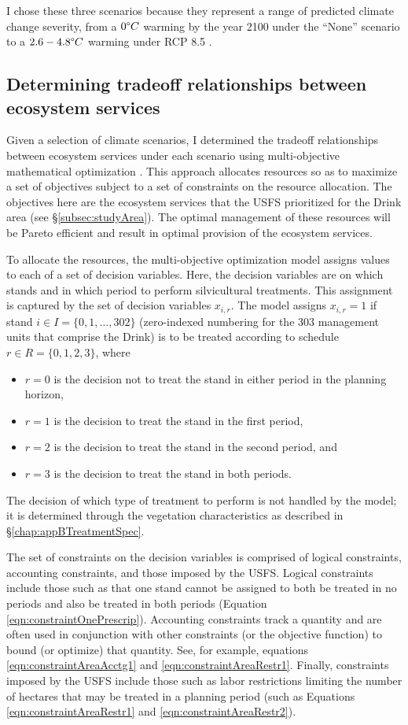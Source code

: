 I chose these three scenarios because they represent a range of predicted climate change severity, from a $0 \degree C$ warming by the year 2100 under the ``None'' scenario to a $2.6-4.8 \degree C$ warming under RCP 8.5 \cite{ipcc2013climate}.

\subsection{Determining tradeoff relationships between ecosystem services}
\label{subsec:whyUsingMultiObjModel}
Given a selection of climate scenarios, I determined the tradeoff relationships between ecosystem services under each scenario using multi-objective mathematical optimization \cite{TothFsci2009}. This approach allocates resources so as to maximize a set of objectives subject to a set of constraints on the resource allocation. The objectives here are the ecosystem services that the USFS prioritized for the Drink area (see \S \ref{subsec:studyArea}). The optimal management of these resources will be Pareto efficient and result in optimal provision of the ecosystem services.

To allocate the resources, the multi-objective optimization model assigns values to each of a set of decision variables. Here, the decision variables are on which stands and in which period to perform silvicultural treatments. This assignment is captured by the set of decision variables $x_{i,r}$. The model assigns $x_{i,r} = 1$ if stand $i \in I = \{0,1,\ldots,302\}$ (zero-indexed numbering for the 303 management units that comprise the Drink) is to be treated according to schedule $r \in R = \{0,1,2,3\}$, where
\begin{itemize}
\item $r = 0$ is the decision not to treat the stand in either period in the planning horizon,\item $r = 1$ is the decision to treat the stand in the first period,
\item $r = 2$ is the decision to treat the stand in the second period, and
\item $r = 3$ is the decision to treat the stand in both periods.
\end{itemize}
The decision of which type of treatment to perform is not handled by the model; it is determined through the vegetation characteristics as described in \S \ref{chap:appBTreatmentSpec}.

The set of constraints on the decision variables is comprised of logical constraints, accounting constraints, and those imposed by the USFS. Logical constraints include those such as that one stand cannot be assigned to both be treated in no periods and also be treated in both periods (Equation \ref{eqn:constraintOnePrescrip}). Accounting constraints track a quantity and are often used in conjunction with other constraints (or the objective function) to bound (or optimize) that quantity. See, for example, equations \ref{eqn:constraintAreaAcctg1} and \ref{eqn:constraintAreaRestr1}. Finally, constraints imposed by the USFS include those such as labor restrictions limiting the number of hectares that may be treated in a planning period (such as Equations \ref{eqn:constraintAreaRestr1} and \ref{eqn:constraintAreaRestr2}).

